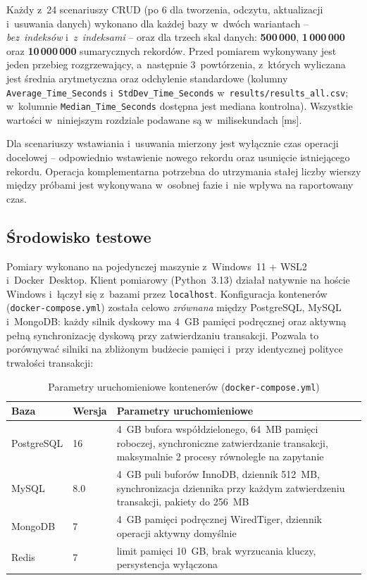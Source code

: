 \documentclass[12pt,a4paper]{article}
\begin{document}
Każdy z~24 scenariuszy CRUD (po 6 dla tworzenia, odczytu, aktualizacji i~usuwania danych) wykonano dla każdej bazy w~dwóch wariantach -- \emph{bez~indeksów} i~\emph{z~indeksami} -- oraz dla trzech skal danych: \textbf{500\,000}, \textbf{1\,000\,000} oraz \textbf{10\,000\,000} sumarycznych rekordów. Przed pomiarem wykonywany jest jeden przebieg rozgrzewający, a~następnie 3~powtórzenia, z~których wyliczana jest średnia arytmetyczna oraz odchylenie standardowe (kolumny \texttt{Average\_Time\_Seconds} i~\texttt{StdDev\_Time\_Seconds} w~\texttt{results/results\_all.csv}; w~kolumnie \texttt{Median\_Time\_Seconds} dostępna jest mediana kontrolna). Wszystkie wartości w~niniejszym rozdziale podawane są w~milisekundach [ms].

Dla scenariuszy wstawiania i~usuwania mierzony jest wyłącznie czas operacji docelowej -- odpowiednio wstawienie nowego rekordu oraz usunięcie istniejącego rekordu. Operacja komplementarna potrzebna do utrzymania stałej liczby wierszy między próbami jest wykonywana w~osobnej fazie i~nie wpływa na raportowany czas.

\subsection{Środowisko testowe}
\label{sec:env}

Pomiary wykonano na pojedynczej maszynie z~Windows~11 + WSL2 i~Docker~Desktop. Klient pomiarowy (Python~3.13) działał natywnie na hoście Windows i~łączył się z~bazami przez \texttt{localhost}. Konfiguracja kontenerów (\texttt{docker-compose.yml}) została celowo \emph{zrównana} między PostgreSQL, MySQL i~MongoDB: każdy silnik dyskowy ma 4~GB pamięci podręcznej oraz aktywną pełną synchronizację dyskową przy zatwierdzaniu transakcji. Pozwala to porównywać silniki na zbliżonym budżecie pamięci i~przy identycznej polityce trwałości transakcji:

\begin{table}[H]
\centering
\caption{Parametry uruchomieniowe kontenerów (\texttt{docker-compose.yml})}
\label{tab:env}
\small
\begin{tabular}{@{}llp{8cm}@{}}
\toprule
\textbf{Baza} & \textbf{Wersja} & \textbf{Parametry uruchomieniowe} \\
\midrule
PostgreSQL & 16 & 4~GB bufora współdzielonego, 64~MB pamięci roboczej, synchroniczne zatwierdzanie transakcji, maksymalnie 2 procesy równoległe na zapytanie \\
MySQL & 8.0 & 4~GB puli buforów InnoDB, dziennik 512~MB, synchronizacja dziennika przy każdym zatwierdzeniu transakcji, pakiety do 256~MB \\
MongoDB & 7 & 4~GB pamięci podręcznej WiredTiger, dziennik operacji aktywny domyślnie \\
Redis & 7 & limit pamięci 10~GB, brak wyrzucania kluczy, persystencja wyłączona \\
\bottomrule
\end{tabular}
\end{table}
\end{document}
